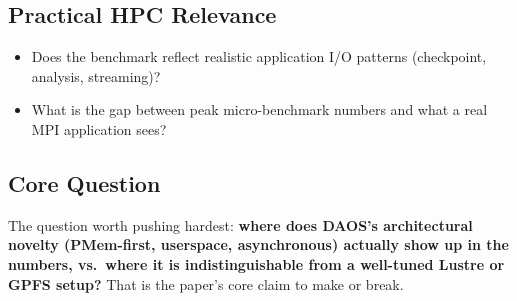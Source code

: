 {\subsection*{Practical HPC Relevance}

\begin{itemize}
    \item Does the benchmark reflect realistic application I/O patterns (checkpoint, analysis, streaming)?
    \item What is the gap between peak micro-benchmark numbers and what a real MPI application sees?
\end{itemize}

\subsection*{Core Question}

The question worth pushing hardest: \textbf{where does DAOS's architectural novelty
(PMem-first, userspace, asynchronous) actually show up in the numbers, vs.\ where it is
indistinguishable from a well-tuned Lustre or GPFS setup?}
That is the paper's core claim to make or break.

}
